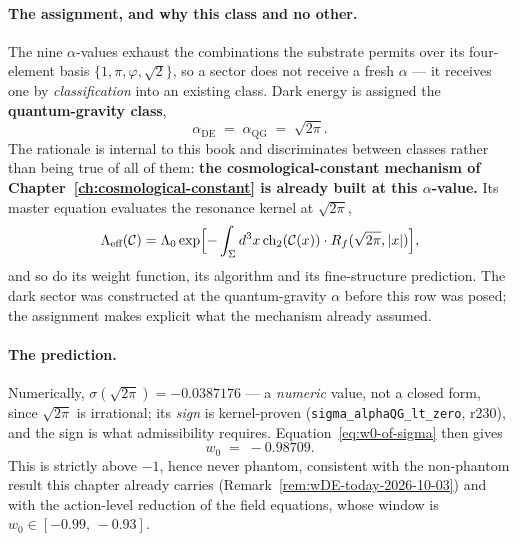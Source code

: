 \begin{remark}
\paragraph{The assignment, and why this class and no other.}
The nine $\alpha$-values exhaust the combinations the substrate permits over its
four-element basis $\{1, \pi, \varphi, \sqrt{2}\}$, so a sector does not receive
a fresh $\alpha$ --- it receives one by \emph{classification} into an existing
class. Dark energy is assigned the \textbf{quantum-gravity class},
\begin{equation}
\alpha_{\text{DE}} \;=\; \alpha_{\text{QG}} \;=\; \sqrt{2\pi}.
\end{equation}
The rationale is internal to this book and discriminates between classes rather
than being true of all of them: \textbf{the cosmological-constant mechanism of
Chapter~\ref{ch:cosmological-constant} is already built at this $\alpha$-value.}
Its master equation evaluates the resonance kernel at $\sqrt{2\pi}$,
\[
\Lambda_{\text{eff}}(\mathcal{C}) = \Lambda_0 \exp\Bigl[-\int_\Sigma d^3x\,
  \text{ch}_2(\mathcal{C}(x))\cdot R_f(\sqrt{2\pi},|x|)\Bigr],
\]
and so do its weight function, its algorithm and its fine-structure prediction.
The dark sector was constructed at the quantum-gravity $\alpha$ before this row
was posed; the assignment makes explicit what the mechanism already assumed.

\paragraph{The prediction.}
Numerically, $\sigma(\sqrt{2\pi}) = -0.0387176$ --- a \emph{numeric} value, not
a closed form, since $\sqrt{2\pi}$ is irrational; its \emph{sign} is
kernel-proven (\texttt{sigma\_alphaQG\_lt\_zero}, r230), and the sign is what
admissibility requires. Equation~\eqref{eq:w0-of-sigma} then gives
\begin{equation}
w_0 \;=\; -0.98709 .
\end{equation}
This is strictly above $-1$, hence never phantom, consistent with the
non-phantom result this chapter already carries
(Remark~\ref{rem:wDE-today-2026-10-03}) and with the action-level reduction of
the field equations, whose window is $w_0 \in [-0.99,\,-0.93]$.


\end{remark}

